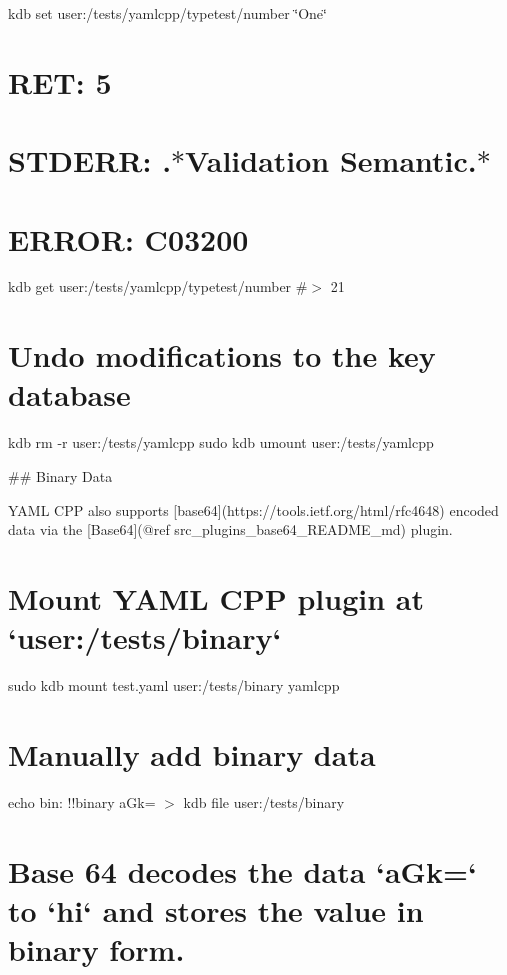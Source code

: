 kdb set user\+:/tests/yamlcpp/typetest/number \char`\"{}\+One\char`\"{} \hypertarget{autotoc_md817_autotoc_md867}{}\section{R\+E\+T\+: 5}\label{autotoc_md817_autotoc_md867}
\hypertarget{autotoc_md817_autotoc_md868}{}\section{S\+T\+D\+E\+R\+R\+: .$\ast$\+Validation Semantic.$\ast$}\label{autotoc_md817_autotoc_md868}
\hypertarget{autotoc_md817_autotoc_md869}{}\section{E\+R\+R\+O\+R\+: C03200}\label{autotoc_md817_autotoc_md869}
kdb get user\+:/tests/yamlcpp/typetest/number \#$>$ 21\hypertarget{autotoc_md817_autotoc_md870}{}\section{Undo modifications to the key database}\label{autotoc_md817_autotoc_md870}
kdb rm -\/r user\+:/tests/yamlcpp sudo kdb umount user\+:/tests/yamlcpp 
\begin{DoxyCode}
## Binary Data

YAML CPP also supports [base64](https://tools.ietf.org/html/rfc4648) encoded data via the [Base64](@ref
       src\_plugins\_base64\_README\_md) plugin.
\end{DoxyCode}
 \hypertarget{autotoc_md817_autotoc_md871}{}\section{Mount Y\+A\+M\+L C\+P\+P plugin at `user\+:/tests/binary`}\label{autotoc_md817_autotoc_md871}
sudo kdb mount test.\+yaml user\+:/tests/binary yamlcpp \hypertarget{autotoc_md817_autotoc_md872}{}\section{Manually add binary data}\label{autotoc_md817_autotoc_md872}
echo \textquotesingle{}bin\+: !!binary a\+Gk=\textquotesingle{} $>$ {\ttfamily kdb file user\+:/tests/binary}\hypertarget{autotoc_md817_autotoc_md873}{}\section{Base 64 decodes the data `a\+Gk=` to `hi` and stores the value in binary form.}\label{autotoc_md817_autotoc_md873}
